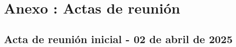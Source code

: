 \documentclass[letter,oneside,12pt,spanish]{report}
\begin{document}
\chapter*{Anexo \thechapter: Actas de reunión}
\label{anexo:actas}

\section*{Acta de reunión inicial - 02 de abril de 2025}
\label{anexo:acta-abril-2025}






\end{document}
